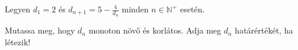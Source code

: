 \documentclass[11pt]{scrartcl}
\begin{document}
Legyen $d_1 = 2$ és \(\displaystyle d_{n + 1} = 5 - \frac{4}{d_n}\) minden
$n \in \mathbb{N}^+$ esetén.

Mutassa meg, hogy $d_n$ monoton növő és korlátos. Adja meg $d_n$
határértékét, ha létezik!
\end{document}
